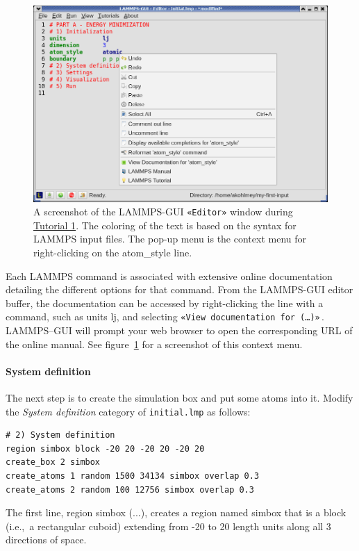 \documentclass[9pt,tutorial]{livecoms}
\newcommand{\lmpcmd}[1]{\hspace{0pt}\colorbox{listing}{\textcolor{command}{\small{#1}}}\hspace{0pt}} %
\newcommand{\flecmd}[1]{\textcolor{command}{\texttt{#1}}} %
\newcommand{\guicmd}[1]{\textcolor{command}{\texttt{«#1»}}} %
\begin{document}
\begin{figure}
\centering
\includegraphics[width=\linewidth]{GUI-1.png}
\caption{A screenshot of the LAMMPS-GUI \guicmd{Editor} window during
  \hyperref[lennard-jones-label]{Tutorial 1}.  The coloring of the text
  is based on the syntax for LAMMPS input files.  The pop-up menu is the
  context menu for right-clicking on the \lmpcmd{atom\_style} line.}
\label{fig:GUI-1}
\end{figure}

Each LAMMPS command is associated with extensive online documentation
detailing the different options for that command.  From the LAMMPS-GUI
editor buffer, the documentation can be accessed by
right-clicking the line with a command, such as \lmpcmd{units lj}, and
selecting \guicmd{View documentation for (\dots)}\,.  LAMMPS--GUI will
prompt your web browser to open the corresponding URL of the online manual.  See
figure~\ref{fig:GUI-1} for a screenshot of this context menu.

\paragraph{System definition}

The next step is to create the simulation box and put some atoms into it.
Modify the \textit{System definition} category of \flecmd{initial.lmp} as follows:
\begin{lstlisting}
# 2) System definition
region simbox block -20 20 -20 20 -20 20
create_box 2 simbox
create_atoms 1 random 1500 34134 simbox overlap 0.3
create_atoms 2 random 100 12756 simbox overlap 0.3
\end{lstlisting}

The first line, \lmpcmd{region simbox (...)}, creates a region
named \lmpcmd{simbox} that is a block (i.e.,~a rectangular
cuboid) extending from -20 to 20 length units along all 3 directions
of space.  %
\end{document}
